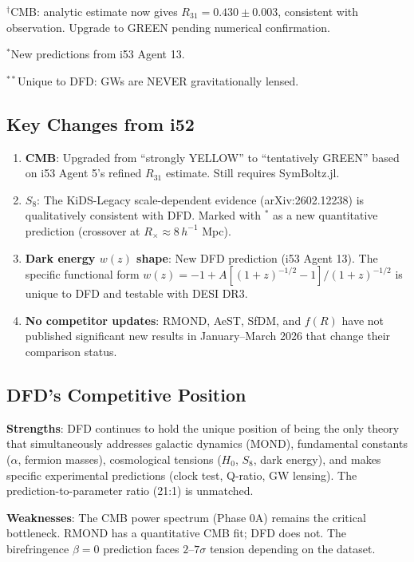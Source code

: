\documentclass[11pt,a4paper]{article}
\begin{document}
$^\dagger$CMB: analytic estimate now gives $R_{31} = 0.430 \pm 0.003$, consistent with observation. Upgrade to GREEN pending numerical confirmation.

$^*$New predictions from i53 Agent 13.

$^{**}$Unique to DFD: GWs are NEVER gravitationally lensed.

\subsection{Key Changes from i52}

\begin{enumerate}
\item \textbf{CMB}: Upgraded from ``strongly YELLOW'' to ``tentatively GREEN'' based on i53 Agent 5's refined $R_{31}$ estimate. Still requires SymBoltz.jl.

\item \textbf{$S_8$}: The KiDS-Legacy scale-dependent evidence (arXiv:2602.12238) is qualitatively consistent with DFD. Marked with $^*$ as a new quantitative prediction (crossover at $R_\times \approx 8\,h^{-1}$ Mpc).

\item \textbf{Dark energy $w(z)$ shape}: New DFD prediction (i53 Agent 13). The specific functional form $w(z) = -1 + A[(1+z)^{-1/2} - 1]/(1+z)^{-1/2}$ is unique to DFD and testable with DESI DR3.

\item \textbf{No competitor updates}: RMOND, AeST, SfDM, and $f(R)$ have not published significant new results in January--March 2026 that change their comparison status.
\end{enumerate}

\subsection{DFD's Competitive Position}

\textbf{Strengths}: DFD continues to hold the unique position of being the only theory that simultaneously addresses galactic dynamics (MOND), fundamental constants ($\alpha$, fermion masses), cosmological tensions ($H_0$, $S_8$, dark energy), and makes specific experimental predictions (clock test, Q-ratio, GW lensing). The prediction-to-parameter ratio (21:1) is unmatched.

\textbf{Weaknesses}: The CMB power spectrum (Phase 0A) remains the critical bottleneck. RMOND has a quantitative CMB fit; DFD does not. The birefringence $\beta = 0$ prediction faces $2$--$7\sigma$ tension depending on the dataset.
\end{document}

